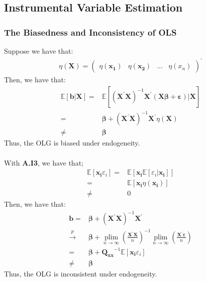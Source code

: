 \documentclass{article}
\begin{document}
\subsection{Instrumental Variable Estimation}
\subsubsection{The Biasedness and Inconsistency of OLS}
Suppose we have that:
	\begin{align*}
		\eta(\boldsymbol{X}) = 
		\begin{pmatrix}
			\eta(\boldsymbol{x_1}) & \eta(\boldsymbol{x_2}) & \ldots & \eta(x_n)
		\end{pmatrix}^\prime
	\end{align*}
Then, we have that:
	\begin{align*}
		\mathbb{E}[\boldsymbol{b} | \boldsymbol{X}] = &\mathbb{E}[(\boldsymbol{X}^\prime \boldsymbol{X})^{-1} \boldsymbol{X}^\prime (\boldsymbol{X} \boldsymbol{\beta} + \boldsymbol{\varepsilon}) | \boldsymbol{X}]\\ = &
		\boldsymbol{\beta} + (\boldsymbol{X}^\prime \boldsymbol{X})^{-1} \boldsymbol{X}^\prime \eta(\boldsymbol{X})\\ \neq &
		\boldsymbol{\beta}
	\end{align*}
Thus, the OLG is biased under endogeneity.\\\\
With \textbf{A.I3}, we have that;
	\begin{align*}
		\mathbb{E}[\boldsymbol{x_i}\varepsilon_i] = & \mathbb{E}[\boldsymbol{x_i} \mathbb{E}[\varepsilon_i | \boldsymbol{x_i}]]\\ = &
		\mathbb{E}[\boldsymbol{x_i} \eta(\boldsymbol{x_i})]\\ \neq &
		0
	\end{align*}
Then, we have that:
	\begin{align*}
		\boldsymbol{b} = &\boldsymbol{\beta} + (\boldsymbol{X}^\prime \boldsymbol{X})^{-1} \boldsymbol{X}^\prime\\ \xrightarrow{p} &
		\boldsymbol{\beta} + \mathop{plim}\limits_{n\to\infty} \left( \frac{\boldsymbol{X}^\prime \boldsymbol{X}}{n} \right)^{-1} \mathop{plim}\limits_{n\to\infty} \left( \frac{\boldsymbol{X}^\prime \boldsymbol{\varepsilon}}{n} \right)\\ = &
		\boldsymbol{\beta} + \boldsymbol{Q_{xx}}^{-1} \mathbb{E}[\boldsymbol{x_i} \varepsilon_i]\\ \neq &
		\boldsymbol{\beta}
	\end{align*}
Thus, the OLG is inconsistent under endogeneity.	
\end{document}
